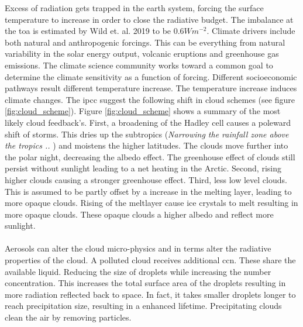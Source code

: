 Excess of radiation gets trapped in the earth system, forcing the surface temperature to increase in order to close the radiative budget. The imbalance at the \acrfull{toa} is estimated by Wild et. al. 2019 to be $0.6W m^{-2}$. 
Climate drivers include both natural and anthropogenic forcings. This can be everything from natural variability in the solar energy output, volcanic eruptions and greenhouse gas emissions. The climate science community works toward a common goal to determine the climate sensitivity as a function of forcing. Different socioeconomic pathways result different temperature increase. The temperature increase induces climate changes. The \acrfull{ipcc} suggest the following shift in cloud schemes (see figure \ref{fig:cloud_scheme}). Figure \ref{fig:cloud_scheme} shows a summary of the most likely cloud feedback's. First, a broadening of the Hadley cell causes a poleward shift of storms. This dries up the subtropics (\textit{Narrowing the rainfall zone above the tropics .. }) and moistens the higher latitudes. The clouds move further into the polar night, decreasing the albedo effect. The greenhouse effect of clouds still persist without sunlight leading to a net heating in the Arctic. Second, rising higher clouds causing a stronger greenhouse effect. Third, less low level clouds. This is assumed to be partly offset by a increase in the melting layer, leading to more opaque clouds. Rising of the meltlayer cause ice crystals to melt resulting in more opaque clouds. These opaque clouds a higher albedo and reflect more sunlight. 
\\ \\
Aerosols can alter the cloud micro-physics and in terms alter the radiative properties of the cloud. A polluted cloud receives additional \acrshort{ccn}. These share the available liquid. Reducing the size of droplets while increasing the number concentration. This increases the total surface area of the droplets resulting in more radiation reflected back to space. In fact, it takes smaller droplets longer to reach precipitation size, resulting in a enhanced lifetime. Precipitating clouds clean the air by removing particles. 
